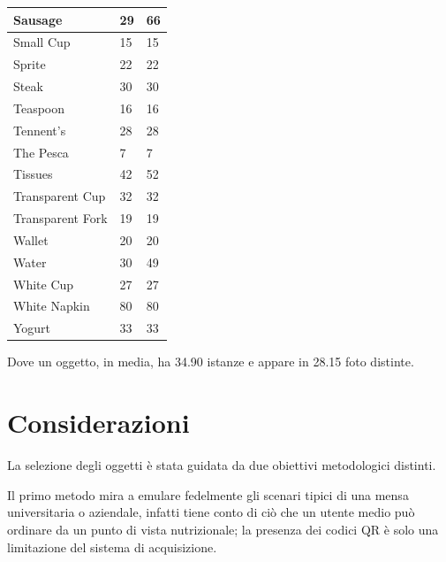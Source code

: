 \documentclass[../main.tex]{subfiles}
\begin{document}
\begin{table}[h!]
\begin{tabular}{|l|l|l|}
        Sausage & 29 & 66 \\ \hline
        Small Cup & 15 & 15 \\ \hline
        Sprite & 22 & 22 \\ \hline
        Steak & 30 & 30 \\ \hline
        Teaspoon & 16 & 16 \\ \hline
        Tennent's & 28 & 28 \\ \hline
        The Pesca & 7 & 7 \\ \hline
        Tissues & 42 & 52 \\ \hline
        Transparent Cup & 32 & 32 \\ \hline
        Transparent Fork & 19 & 19 \\ \hline
        Wallet & 20 & 20 \\ \hline
        Water & 30 & 49 \\ \hline
        White Cup & 27 & 27 \\ \hline
        White Napkin & 80 & 80 \\ \hline
        Yogurt & 33 & 33 \\ \hline
    \end{tabular}
    \begin{tablenotes}
        \small
        \item[1] Dove un oggetto, in media, ha 34.90 istanze e appare in 28.15 foto distinte.
    \end{tablenotes}
\end{table}

\clearpage

\section{Considerazioni}
La selezione degli oggetti è stata guidata da due obiettivi metodologici distinti.

\vspace{\baselineskip}
\noindent
Il primo metodo mira a emulare fedelmente gli scenari tipici di una mensa universitaria o aziendale, infatti tiene conto di ciò che un utente medio può ordinare da un punto di vista nutrizionale; la presenza dei codici QR è solo una limitazione del sistema di acquisizione.
\end{document}
